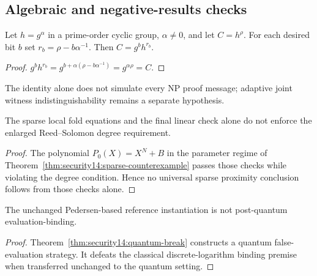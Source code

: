 \subsection{Algebraic and negative-results checks}
\begin{lemma}\label{lem:cert15:equiv}
Let $h=g^\alpha$ in a prime-order cyclic group, $\alpha\ne0$, and let $C=h^\rho$. For each desired bit $b$ set $r_b=\rho-b\alpha^{-1}$. Then $C=g^b h^{r_b}$.
\end{lemma}
\begin{proof}
$g^b h^{r_b}=g^{b+\alpha(\rho-b\alpha^{-1})}=g^{\alpha\rho}=C$.
\end{proof}
The identity alone does not simulate every NP proof message; adaptive joint witness indistinguishability remains a separate hypothesis.

\begin{proposition}\label{prop:cert15:sparse}
The sparse local fold equations and the final linear check alone do not enforce the enlarged Reed--Solomon degree requirement.
\end{proposition}
\begin{proof}
The polynomial $P_0(X)=X^N+B$ in the parameter regime of Theorem~\ref{thm:security14:sparse-counterexample} passes those checks while violating the degree condition. Hence no universal sparse proximity conclusion follows from those checks alone.
\end{proof}
\begin{proposition}\label{prop:cert15:pq}
The unchanged Pedersen-based reference instantiation is not post-quantum evaluation-binding.
\end{proposition}
\begin{proof}
Theorem~\ref{thm:security14:quantum-break} constructs a quantum false-evaluation strategy. It defeats the classical discrete-logarithm binding premise when transferred unchanged to the quantum setting.
\end{proof}

